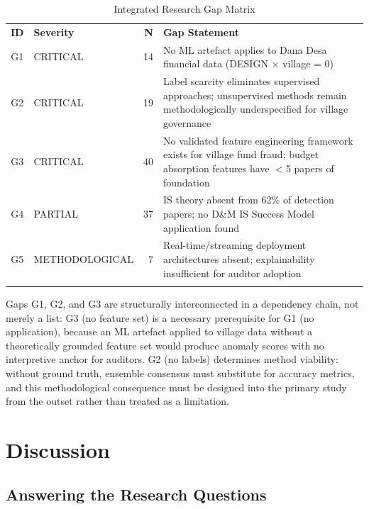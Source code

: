 \documentclass[3p,times,procedia]{elsarticle}
\begin{document}
\begin{table}[htb]
\caption{Integrated Research Gap Matrix}
\label{tab:gaps}
\small
\begin{tabular*}{\hsize}{@{\extracolsep{\fill}}clrp{7cm}@{}}
\toprule
\textbf{ID} & \textbf{Severity} & \textbf{N} & \textbf{Gap Statement} \\
\colrule
G1 & CRITICAL     & 14 & No ML artefact applies to Dana Desa financial data (DESIGN $\times$ village = 0) \\
G2 & CRITICAL     & 19 & Label scarcity eliminates supervised approaches; unsupervised methods remain methodologically underspecified for village governance \\
G3 & CRITICAL     & 40 & No validated feature engineering framework exists for village fund fraud; budget absorption features have $<$5 papers of foundation \\
G4 & PARTIAL      & 37 & IS theory absent from 62\% of detection papers; no D\&M IS Success Model application found \\
G5 & METHODOLOGICAL & 7 & Real-time/streaming deployment architectures absent; explainability insufficient for auditor adoption \\
\botrule
\end{tabular*}
\end{table}

Gaps G1, G2, and G3 are structurally interconnected in a dependency chain, not merely a
list: G3 (no feature set) is a necessary prerequisite for G1 (no application), because an
ML artefact applied to village data without a theoretically grounded feature set would
produce anomaly scores with no interpretive anchor for auditors. G2 (no labels) determines
method viability: without ground truth, ensemble consensus must substitute for accuracy
metrics, and this methodological consequence must be designed into the primary study
from the outset rather than treated as a limitation.

\section{Discussion}
\label{sec:discussion}

\subsection{Answering the Research Questions}
\end{document}
